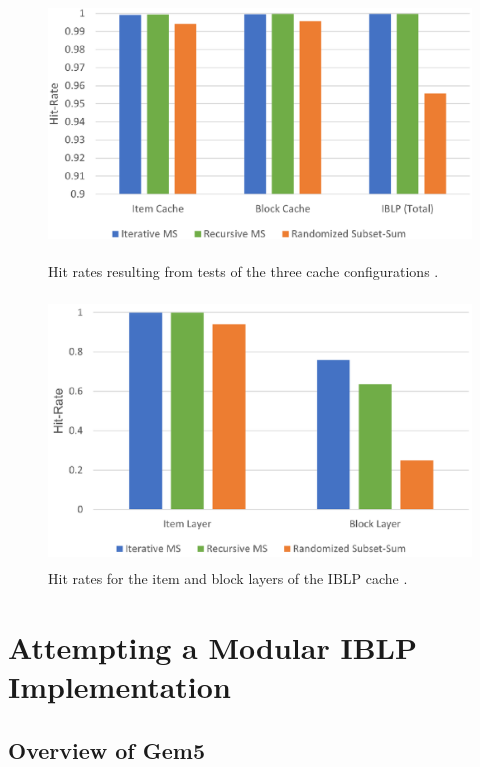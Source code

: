 \documentclass[12pt,twoside]{reedthesis}
\begin{document}
	\newpage
	\null
	\vfill

	\begin{figure}[H]
		\centering
		\includegraphics[height=2.8in]{figures/curtis_cache_hit_rates.png}
		\caption{Hit rates resulting from tests of the three cache configurations \cite{curtis}.}
	\end{figure}

	\vfill

	\begin{figure}[H]
		\centering
		\includegraphics[height=2.8in]{figures/curtis_layer_hit_rates.png}
		\caption{Hit rates for the item and block layers of the IBLP cache \cite{curtis}.}
	\end{figure}

	\vfill

\chapter{Attempting a Modular IBLP Implementation}

\section{Overview of Gem5}
\end{document}
